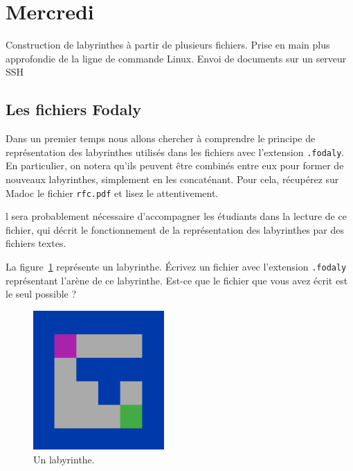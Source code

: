\documentclass[a4paper]{article}
\newenvironment{objectif}{%
  \begin{framed}%
  \noindent{\bf Objectifs du jour~:}%
}{%
  \end{framed}%
}
\newenvironment{enseignants}[1]{\noindent\color{blue}{\bf #1}}{}
\begin{document}


\section{Mercredi}

\begin{objectif}
  Construction de labyrinthes à partir de plusieurs fichiers.
  Prise en main plus approfondie de la ligne de commande Linux.
  Envoi de documents sur un serveur SSH
\end{objectif}

\subsection{Les fichiers Fodaly}

Dans un premier temps nous allons chercher à comprendre le principe de représentation des labyrinthes utilisés dans les fichiers avec l'extension \verb|.fodaly|.
En particulier, on notera qu'ils peuvent être combinés entre eux pour former de nouveaux labyrinthes, simplement en les concaténant.
Pour cela, récupérez sur Madoc le fichier \verb|rfc.pdf| et lisez le attentivement.

\begin{enseignants}
  Il sera probablement nécessaire d'accompagner les étudiants dans la lecture de ce fichier, qui décrit le fonctionnement de la représentation des labyrinthes par des fichiers textes.
\end{enseignants}

La figure~\ref{fig:alab} représente un labyrinthe.
Écrivez un fichier avec l'extension \verb|.fodaly| représentant l'arène de ce labyrinthe.
Est-ce que le fichier que vous avez écrit est le seul possible ?

\begin{figure}[htbp]
  \centering
  \includegraphics[width=5cm]{fig1.png}
  \caption{Un labyrinthe.}\label{fig:alab}
\end{figure}
\end{document}

